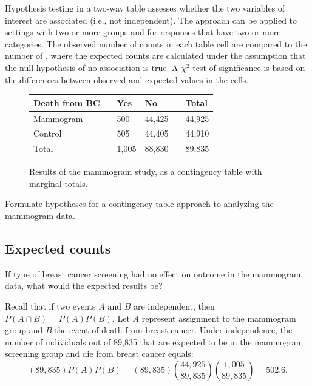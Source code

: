 Hypothesis testing in a two-way table assesses whether the two variables of interest are associated (i.e., not independent). The approach can be applied to settings with two or more groups and for responses that have two or more categories. The observed number of counts in each table cell are compared to the number of , where the expected counts are calculated under the assumption that the null hypothesis of no association is true. A $\chi^2$ test of significance is based on the differences between observed and expected values in the cells.

\begin{figure}[h]
	\centering
	\begin{tabular}{l| l l l l |l}
		\hline
		Death from BC & \hspace{1mm}  & Yes & No & \hspace{1mm} & Total \\
		\hline
		Mammogram				   &    & 500 & 44,425 & 				&44,925 \\
		Control				   &     & 505	& 44,405    &				& 44,910 \\
		\hline
		Total						   &    & 1,005 & 88,830 & 				& 89,835 \\
		\hline
	\end{tabular}
	\caption{Results of the mammogram study, as a contingency table with marginal totals.}
	\label{mammogramStudySummaryTableWithTotals}
\end{figure}

\begin{exercisewrap}
\begin{nexercise}
Formulate hypotheses for a contingency-table approach to analyzing the mammogram data.\footnotemark{}
\end{nexercise}
\end{exercisewrap}


\subsection{Expected counts}
\label{twoWayTablesExpectedCounts}

If type of breast cancer screening had no effect on outcome in the mammogram data, what would the expected results be? 

Recall that if two events $A$ and $B$ are independent, then $P(A \cap B) = P(A)P(B)$. Let $A$ represent assignment to the mammogram group and $B$ the event of death from breast cancer. Under independence, the number of individuals out of 89,835 that are expected to be in the mammogram screening group and die from breast cancer equals:
\[(89,835) P(A)P(B) = (89,835) \left(\frac{44,925}{89,835}\right) \left(\frac{1,005}{89,835} \right) = 502.6. \]

